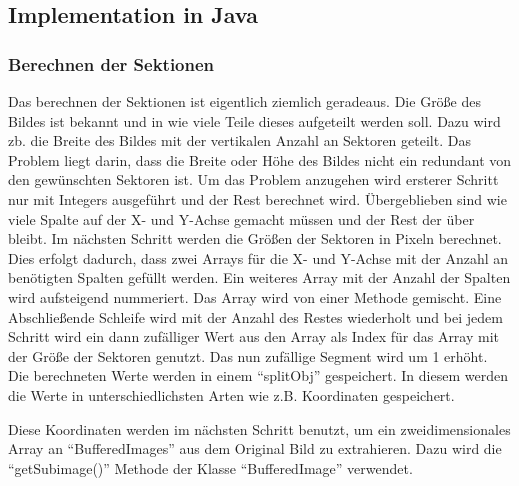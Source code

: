 \subsection{Implementation in Java}
\subsubsection{Berechnen der Sektionen}
Das berechnen der Sektionen ist eigentlich ziemlich geradeaus. Die Größe des Bildes ist bekannt und in wie viele Teile dieses aufgeteilt werden soll. Dazu wird zb. die Breite des Bildes mit der vertikalen Anzahl an Sektoren geteilt. Das Problem liegt darin, dass die Breite oder Höhe des Bildes nicht ein redundant von den gewünschten Sektoren ist. Um das Problem anzugehen wird ersterer Schritt nur mit Integers ausgeführt und der Rest berechnet wird. Übergeblieben sind wie viele Spalte auf der X- und Y-Achse gemacht müssen und der Rest der über bleibt. Im nächsten Schritt werden die Größen der Sektoren in Pixeln berechnet. Dies erfolgt dadurch, dass zwei Arrays für die X- und Y-Achse mit der Anzahl an benötigten Spalten gefüllt werden. Ein weiteres Array mit der Anzahl der Spalten wird aufsteigend nummeriert. Das Array wird von einer Methode gemischt. Eine Abschließende Schleife wird mit der Anzahl des Restes wiederholt und bei jedem Schritt wird ein dann zufälliger Wert aus den Array als Index für das Array mit der Größe der Sektoren genutzt. Das nun zufällige Segment wird um 1 erhöht. Die berechneten Werte werden in einem ``splitObj'' gespeichert. In diesem werden die Werte in unterschiedlichsten Arten wie z.B. Koordinaten gespeichert. 

Diese Koordinaten werden im nächsten Schritt benutzt, um ein zweidimensionales Array an ``BufferedImages'' aus dem Original Bild zu extrahieren. Dazu wird die ``getSubimage()'' Methode der Klasse ``BufferedImage'' verwendet.

